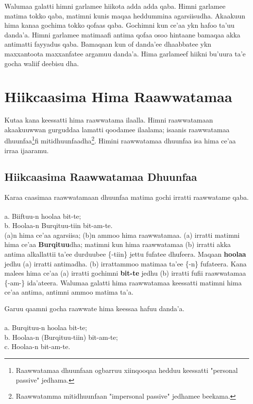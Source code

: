 \documentclass[11pt,b5paper]{book}
\begin{document}
Walumaa galatti himni garlamee hiikota adda adda 	qaba. Himni garlamee matima tokko qaba, matimni kunis 	maqaa heddummina agarsiisudha. Akaakuun hima kanaa 	gochima tokko qofaas qaba. Gochimni kun ce’aa ykn hafoo 	ta’uu danda’a. Himni garlamee matimaafi antima qofaa osoo
hintaane bamaqaa akka antimatti fayyadus qaba. Bamaqaan kun of danda’ee dhaabbatee ykn maxxantoota maxxanfatee argamuu danda’a. Hima garlameef hiikni bu’uura ta’e gocha waliif deebisu dha. 

\section{Hiikcaasima Hima Raawwatamaa}
Kutaa kana keessatti hima raawwatama  ilaalla. Himni raawwatamaan akaakuuwwan gurguddaa lamatti qoodamee
ilaalama; isaanis raawwatamaa dhuunfaa\footnote{Raawwatamaa dhuunfaan ogbarruu xiinqooqaa hedduu keessatti "personal passive" jedhama.}fi mitidhuunfaadha\footnote{Raawwatamma mitidhuunfaan "impersonal passive" jedhamee beekama.}. Himini raawwatamaa dhuunfaa isa hima ce’aa
irraa ijaaramu. 
	\subsection{Hiikcaasima Raawwatamaa Dhuunfaa}
Karaa caasimaa raawwatamaan dhuunfaa  matima gochi irratti raawwatame qaba. \\
\\
a. Biiftuu-n hoolaa bit-te;\\
b. Hoolaa-n Burqituu-tiin bit-am-te. \\

(a)n hima ce’aa agarsiisa; (b)n ammoo hima raawwatamaa. (a) irratti matimni hima ce’aa \textbf{Burqituu}dha; matimni kun hima raawwatamaa (b) irratti akka antima alkallattii ta’ee
durduubee \{-tiin\} jettu fufatee dhufeera. Maqaan \textbf{hoolaa} jedhu (a) irratti antimadha. (b) irrattammoo matimaa ta’ee \{-n\} fufateera. Kana malees hima ce’aa (a) irratti gochimni \textbf{bit-te}
jedhu (b) irratti fufii raawwatamaa \{-am-\} ida’ateera. Walumaa galatti hima raawwatamaa keessatti matimni hima ce’aa antima, antimni ammoo matima ta’a.

Garuu qaamni gocha raawwate hima keessaa hafuu danda’a.\\
\\
a. Burqituu-n hoolaa bit-te;\\
b. Hoolaa-n (Burqituu-tiin) bit-am-te;\\
c. Hoolaa-n bit-am-te.\\
\end{document}
